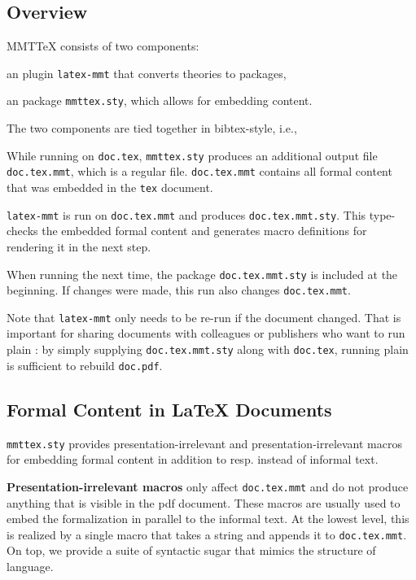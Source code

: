 \subsection{Overview}

MMTTeX consists of two components:
\begin{compactitem}
 \item an \mmt plugin \texttt{latex-mmt} that converts \mmt theories to \latex packages,
 \item an \latex package \texttt{mmttex.sty}, which allows for embedding \mmt content.
\end{compactitem}
The two components are tied together in bibtex-style, i.e.,
\begin{compactenum}
 \item While running \latex on \texttt{doc.tex}, \texttt{mmttex.sty} produces an additional output file \texttt{doc.tex.mmt}, which is a regular \mmt file.
 \texttt{doc.tex.mmt} contains all formal content that was embedded in the \texttt{tex} document.
 \item \texttt{latex-mmt} is run on \texttt{doc.tex.mmt} and produces \texttt{doc.tex.mmt.sty}.
  This type-checks the embedded formal content and generates macro definitions for rendering it in the next step.
 \item When running \latex the next time, the package \texttt{doc.tex.mmt.sty} is included at the beginning. If changes were made, this run also changes \texttt{doc.tex.mmt}.
\end{compactenum}

\noindent
Note that \texttt{latex-mmt} only needs to be re-run if the document changed.
That is important for sharing documents with colleagues or publishers who want to run plain \latex: by simply supplying \texttt{doc.tex.mmt.sty} along with \texttt{doc.tex}, running plain \latex is sufficient to rebuild \texttt{doc.pdf}.

\subsection{Formal Content in LaTeX Documents}

\texttt{mmttex.sty} provides presentation-irrelevant and presentation-irrelevant macros for embedding formal content in addition to resp. instead of informal text.
\medskip

\textbf{Presentation-irrelevant macros} only affect \texttt{doc.tex.mmt} and do not produce anything that is visible in the pdf document.
These macros are usually used to embed the formalization in parallel to the informal text.
At the lowest level, this is realized by a single macro that takes a string and appends it to \texttt{doc.tex.mmt}.
On top, we provide a suite of syntactic sugar that mimics the structure of \mmt language.

